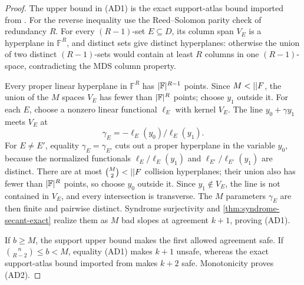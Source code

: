 \documentclass[11pt,a4paper]{amsart}
\numberwithin{equation}{section}
\theoremstyle{remark}
\newcommand{\F}{\mathbb F}\newcommand{\B}{\mathbb B}\newcommand{\K}{\mathbb K}\newcommand{\Z}{\mathbb Z}
\begin{document}
\begin{proof}
The upper bound in \textup{(AD1)} is the exact support-atlas bound imported from \cite[Sec.~13]{CAP25v132}.  For the reverse inequality use the
Reed--Solomon parity check of redundancy \(R\).  For every
\((R-1)\)-set \(E\subseteq D\), its column span \(V_E\) is a hyperplane
in \(\F^R\), and distinct sets give distinct hyperplanes: otherwise the
union of two distinct \((R-1)\)-sets would contain at least \(R\) columns
in one \((R-1)\)-space, contradicting the MDS column property.

Every proper linear hyperplane in \(\F^R\) has
\(\abs{\F}^{R-1}\) points.  Since \(M<\abs\F\), the union of the \(M\)
spaces \(V_E\) has fewer than \(\abs{\F}^{R}\) points; choose \(y_1\)
outside it.  For each \(E\),
choose a nonzero linear functional \(\ell_E\) with kernel \(V_E\).
The line \(y_0+\gamma y_1\) meets \(V_E\) at
\[
                 \gamma_E=-\ell_E(y_0)/\ell_E(y_1).
\]
For \(E\ne E'\), equality \(\gamma_E=\gamma_{E'}\) cuts out a proper
hyperplane in the variable \(y_0\), because the normalized functionals
\(\ell_E/\ell_E(y_1)\) and
\(\ell_{E'}/\ell_{E'}(y_1)\) are distinct.  There are at most
\(\binom M2<\abs\F\) collision hyperplanes; their union also has fewer
than \(\abs{\F}^{R}\) points, so choose \(y_0\) outside it.  Since
\(y_1\notin V_E\), the line is not contained in \(V_E\), and every
intersection is transverse.  The \(M\) parameters \(\gamma_E\) are then
finite and pairwise distinct.  Syndrome surjectivity and
\cref{thm:syndrome-secant-exact} realize them as \(M\) bad slopes at
agreement \(k+1\), proving \textup{(AD1)}.

If \(b\ge M\), the support upper bound makes the first allowed agreement
safe.  If \(\binom n{R-2}\le b<M\), equality \textup{(AD1)} makes
\(k+1\) unsafe, whereas
the exact support-atlas bound imported from \cite[Sec.~13]{CAP25v132} makes \(k+2\) safe.  Monotonicity proves
\textup{(AD2)}.
\end{proof}
\end{document}
